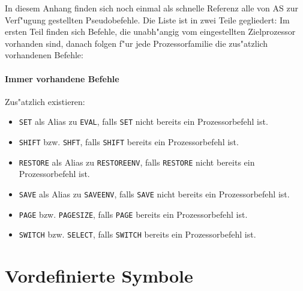 \documentclass[12pt,a4paper,twoside]{report}
\newcommand{\tty}[1]{{\tt #1}}
\begin{document}
In diesem Anhang finden sich noch einmal als schnelle Referenz alle
von AS zur Verf"ugung gestellten Pseudobefehle.  Die Liste ist in zwei
Teile gegliedert: Im ersten Teil finden sich Befehle, die unabh"angig
vom eingestellten Zielprozessor vorhanden sind, danach folgen f"ur
jede Prozessorfamilie die zus"atzlich vorhandenen Befehle:

\subsubsection{Immer vorhandene Befehle}

Zus"atzlich existieren:
\begin{itemize}
\item{\tty{SET} als Alias zu \tty{EVAL}, falls \tty{SET} nicht bereits ein
      Prozessorbefehl ist.}
\item{\tty{SHIFT} bzw. \tty{SHFT}, falls \tty{SHIFT} bereits ein Prozessorbefehl
      ist.}
\item{\tty{RESTORE} als Alias zu \tty{RESTOREENV}, falls \tty{RESTORE} nicht bereits ein
      Prozessorbefehl ist.}
\item{\tty{SAVE} als Alias zu \tty{SAVEENV}, falls \tty{SAVE} nicht bereits ein
      Prozessorbefehl ist.}
\item{\tty{PAGE} bzw. \tty{PAGESIZE}, falls \tty{PAGE} bereits ein Prozessorbefehl
      ist.}
\item{\tty{SWITCH} bzw. \tty{SELECT}, falls \tty{SWITCH} bereits ein Prozessorbefehl
      ist.}
\end{itemize}




\cleardoublepage
\chapter{Vordefinierte Symbole}\label{AppInternSyms}
\end{document}
